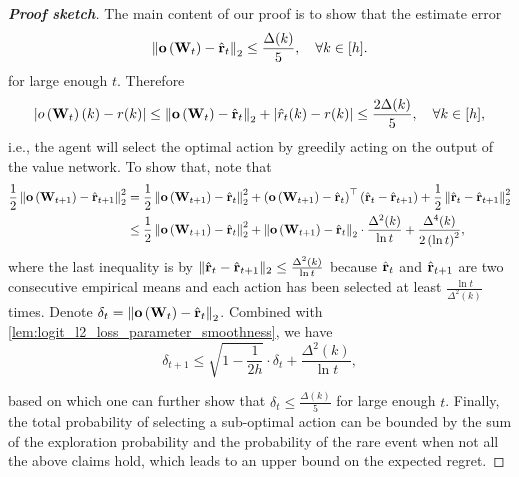 \begin{proof} [\bf Proof sketch]
		The main content of our proof is to show that the estimate error 
		\begin{equation*}
		    \left\| {\mathbf{o}}\left( {\mathbf{W}}_{t} \right) - \hat{{\mathbf{r}}}_{t}\right\|_2 \le \frac{\Delta(k)}{5}, \quad \forall k \in [h].
		\end{equation*}
		for large enough $t$. Therefore 
		\begin{equation*}
		    \left| o\left( {\mathbf{W}}_t \right)(k) - r(k) \right| \le \left\| {\mathbf{o}}\left( {\mathbf{W}}_t \right) - \hat{{\mathbf{r}}}_t\right\|_2 + \left| \hat{r}_t(k) - r(k) \right| \le \frac{2\Delta(k)}{5}, \quad \forall k \in [h],
		\end{equation*}
		i.e., the agent will select the optimal action by greedily acting on the output of the value network. To show that, note that 
		\begin{equation*}
		\begin{split}
		\frac{1}{2} \left\| {\mathbf{o}}\left( {\mathbf{W}}_{t+1} \right) - \hat{{\mathbf{r}}}_{t+1}\right\|_2^2 &= \frac{1}{2} \left\| {\mathbf{o}}\left( {\mathbf{W}}_{t+1} \right) - \hat{{\mathbf{r}}}_t\right\|_2^2 + \left( {\mathbf{o}}\left( {\mathbf{W}}_{t+1} \right) - \hat{{\mathbf{r}}}_t \right)^\top \left( \hat{{\mathbf{r}}}_t - \hat{{\mathbf{r}}}_{t+1} \right) + \frac{1}{2} \left\| \hat{{\mathbf{r}}}_t - \hat{{\mathbf{r}}}_{t+1} \right\|_2^2 \\
		&\le \frac{1}{2} \left\| {\mathbf{o}}\left( {\mathbf{W}}_{t+1} \right) - \hat{{\mathbf{r}}}_t\right\|_2^2 + \left\| {\mathbf{o}}\left( {\mathbf{W}}_{t+1} \right) - \hat{{\mathbf{r}}}_t\right\|_2 \cdot \frac{\Delta^2(k)}{\ln{t}} + \frac{\Delta^4(k)}{2 \left( \ln{t} \right)^2 },
		\end{split}
		\end{equation*}
		where the last inequality is by $\| \hat{{\mathbf{r}}}_t - \hat{{\mathbf{r}}}_{t+1} \|_2 \le \frac{\Delta^2(k)}{\ln{t}}$ because $\hat{{\mathbf{r}}}_t$  and $\hat{{\mathbf{r}}}_{t+1}$ are two consecutive empirical means and each action has been selected at least $\frac{\ln t}{\Delta^2(k)}$ times. Denote $\delta_t =  \left\| {\mathbf{o}}\left( {\mathbf{W}}_{t} \right) - \hat{{\mathbf{r}}}_{t}\right\|_2$. Combined with \cref{lem:logit_l2_loss_parameter_smoothness}, we have
		\begin{equation*}
		    \delta_{t+1} \le \sqrt{1 - \frac{1}{2 h} } \cdot \delta_{t} + \frac{\Delta^2(k)}{\ln{t}},
		\end{equation*}
		
		based on which one can further show that $\delta_t \le \frac{\Delta(k)}{5}$ for large enough $t$. Finally, the total probability of selecting a sub-optimal action can be bounded by the sum of the exploration probability and the probability of the rare event when not all the above claims hold, which leads to an upper bound on the expected regret.
		\end{proof}
